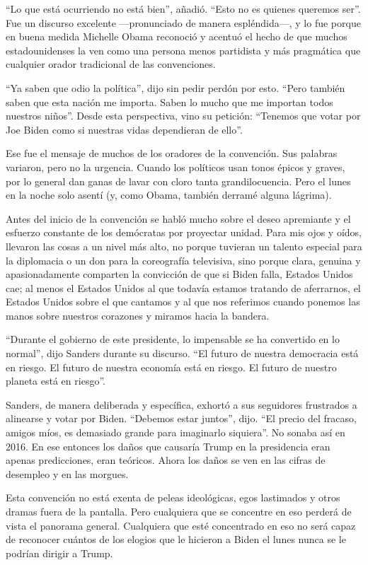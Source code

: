 ``Lo que está ocurriendo no está bien'', añadió. ``Esto no es quienes
queremos ser''. Fue un discurso excelente ---pronunciado de manera
espléndida---, y lo fue porque en buena medida Michelle Obama reconoció
y acentuó el hecho de que muchos estadounidenses la ven como una persona
menos partidista y más pragmática que cualquier orador tradicional de
las convenciones.

``Ya saben que odio la política'', dijo sin pedir perdón por esto.
``Pero también saben que esta nación me importa. Saben lo mucho que me
importan todos nuestros niños''. Desde esta perspectiva, vino su
petición: ``Tenemos que votar por Joe Biden como si nuestras vidas
dependieran de ello''.

Ese fue el mensaje de muchos de los oradores de la convención. Sus
palabras variaron, pero no la urgencia. Cuando los políticos usan tonos
épicos y graves, por lo general dan ganas de lavar con cloro tanta
grandilocuencia. Pero el lunes en la noche solo asentí (y, como Obama,
también derramé alguna lágrima).

Antes del inicio de la convención se habló mucho sobre el deseo
apremiante y el esfuerzo constante de los demócratas por proyectar
unidad. Para mis ojos y oídos, llevaron las cosas a un nivel más alto,
no porque tuvieran un talento especial para la diplomacia o un don para
la coreografía televisiva, sino porque clara, genuina y apasionadamente
comparten la convicción de que si Biden falla, Estados Unidos cae; al
menos el Estados Unidos al que todavía estamos tratando de aferrarnos,
el Estados Unidos sobre el que cantamos y al que nos referimos cuando
ponemos las manos sobre nuestros corazones y miramos hacia la bandera.

``Durante el gobierno de este presidente, lo impensable se ha convertido
en lo normal'', dijo Sanders durante su discurso. ``El futuro de nuestra
democracia está en riesgo. El futuro de nuestra economía está en riesgo.
El futuro de nuestro planeta está en riesgo''.

Sanders, de manera deliberada y específica, exhortó a sus seguidores
frustrados a alinearse y votar por Biden. ``Debemos estar juntos'',
dijo. ``El precio del fracaso, amigos míos, es demasiado grande para
imaginarlo siquiera''. No sonaba así en 2016. En ese entonces los daños
que causaría Trump en la presidencia eran apenas predicciones, eran
teóricos. Ahora los daños se ven en las cifras de desempleo y en las
morgues.

Esta convención no está exenta de peleas ideológicas, egos lastimados y
otros dramas fuera de la pantalla. Pero cualquiera que se concentre en
eso perderá de vista el panorama general. Cualquiera que esté
concentrado en eso no será capaz de reconocer cuántos de los elogios que
le hicieron a Biden el lunes nunca se le podrían dirigir a Trump.

